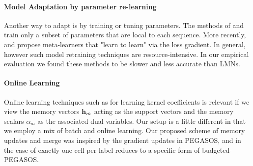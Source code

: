 \documentclass[letterpaper]{article} %
\newcommand{\vek}[1]{{\bf {#1}}}
\newcommand{\vh}{{\vek{h}}}
\begin{document}

%
\paragraph{Model Adaptation by parameter re-learning}
Another way to adapt is by training or tuning parameters. The methods of \cite{Rei15} and \cite{Huang2015MaximumAP} train only a subset of parameters that are local to each sequence.  More recently,\cite{Finn2017ModelAgnosticMF} and \cite{ravi17} propose meta-learners that "learn to learn" via 
the loss gradient. In general, however such model retraining techniques are resource-intensive. In our empirical evaluation we found these methods to be slower and less accurate than LMNs. 

\paragraph{Online Learning} Online learning techniques such as \cite{shalevshwartz:icml07} for learning kernel coefficients is relevant if we view the memory vectors $ \vh_m$ acting as the support vectors and the memory scalars $\alpha_m$ as the associated dual variables.  Our setup is a little different in that we employ a mix of batch and online learning. Our proposed scheme of memory updates and merge was inspired by the gradient updates in PEGASOS, and in the case of exactly one cell per label reduces to a specific form of budgeted-PEGASOS\cite{WangCV10}.
\end{document}
